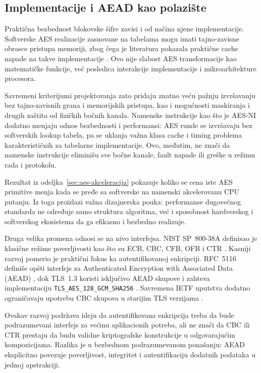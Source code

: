 \subsection{Implementacije i AEAD kao polazište}

Praktična bezbednost blokovske šifre zavisi i od načina njene implementacije.
Softverske AES realizacije zasnovane na tabelama mogu imati
tajno-zavisne obrasce pristupa memoriji, zbog čega je literatura pokazala
praktične cache napade na takve implementacije
\cite{OsvikShamirTromer2006}. Ovo nije slabost AES transformacije kao
matematičke funkcije, već posledica interakcije implementacije i
mikroarhitekture procesora.

Savremeni kriterijumi projektovanja zato pridaju znatno veću pažnju
izvršavanju bez tajno-zavisnih grana i memorijskih pristupa, kao i
mogućnosti maskiranja i drugih zaštita od fizičkih bočnih kanala.
Namenske instrukcije kao što je AES-NI dodatno menjaju odnos bezbednosti
i performansi: AES runde se izvršavaju bez softverskih lookup tabela, pa
se uklanja važna klasa cache i timing problema karakterističnih za
tabelarne implementacije. Ovo, međutim, ne znači da namenske instrukcije
eliminišu sve bočne kanale, fault napade ili greške u režimu rada i
protokolu.

Rezultat iz odeljka~\ref{sec:aes-akceleracija} pokazuje koliko se cena
iste AES primitive menja kada se pređe sa softverske na namenski
akcelerovanu CPU putanju. Iz toga proizlazi važna dizajnerska pouka:
performanse dugovečnog standarda ne određuje samo struktura algoritma,
već i sposobnost hardverskog i softverskog ekosistema da ga efikasno i
bezbedno realizuje.

Druga velika promena odnosi se na nivo interfejsa. NIST SP~800-38A
definisao je klasične režime poverljivosti kao što su ECB, CBC, CFB,
OFB i CTR \cite{Dworkin2001Modes}. Kasniji razvoj pomerio je praktični
fokus ka autentifikovanoj enkripciji. RFC~5116 definiše opšti interfejs
za Authenticated Encryption with Associated Data (AEAD)
\cite{RFC5116}, dok TLS~1.3 koristi isključivo AEAD skupove i zahteva
implementaciju \texttt{TLS\_AES\_128\_GCM\_SHA256}
\cite{rfc8446}. Savremena IETF uputstva dodatno ograničavaju upotrebu
CBC skupova u starijim TLS verzijama \cite{rfc9325}.

Ovakav razvoj podržava ideju da autentifikovana enkripcija treba da bude
podrazumevani interfejs za većinu aplikacionih potreba, ali ne znači da
CBC ili CTR prestaju da budu validne kriptografske konstrukcije u
odgovarajućim kompozicijama. Razlika je u bezbednom podrazumevanom
ponašanju: AEAD eksplicitno povezuje poverljivost, integritet i
autentifikaciju dodatnih podataka u jednoj apstrakciji.

